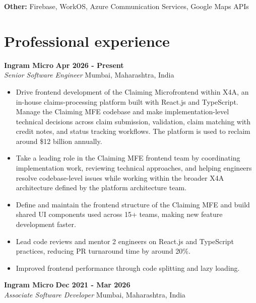 \documentclass[10pt,a4paper]{article}
\newcommand{\resumeEntry}[4]{
    \textbf{#1} \hfill \textbf{#2}\\
    \textit{#3} \hfill #4
}
\begin{document}
\textbf{Other:}
Firebase, WorkOS, Azure Communication Services, Google Maps APIs

\section{Professional experience}

\resumeEntry
{Ingram Micro}
{Apr 2026 - Present}
{Senior Software Engineer}
{Mumbai, Maharashtra, India}

\begin{itemize}
    \item Drive frontend development of the Claiming Microfrontend within X4A, an in-house claims-processing platform built with React.js and TypeScript. Manage the Claiming MFE codebase and make implementation-level technical decisions across claim submission, validation, claim matching with credit notes, and status tracking workflows. The platform is used to reclaim around \$12 billion annually.
    
    \item Take a leading role in the Claiming MFE frontend team by coordinating implementation work, reviewing technical approaches, and helping engineers resolve codebase-level issues while working within the broader X4A architecture defined by the platform architecture team.
    
    \item Define and maintain the frontend structure of the Claiming MFE and build shared UI components used across 15+ teams, making new feature development faster.
    
    \item Lead code reviews and mentor 2 engineers on React.js and TypeScript practices, reducing PR turnaround time by around 20\%.
    
    \item Improved frontend performance through code splitting and lazy loading.
\end{itemize}

\resumeEntry
{Ingram Micro}
{Dec 2021 - Mar 2026}
{Associate Software Developer}
{Mumbai, Maharashtra, India}
\end{document}

